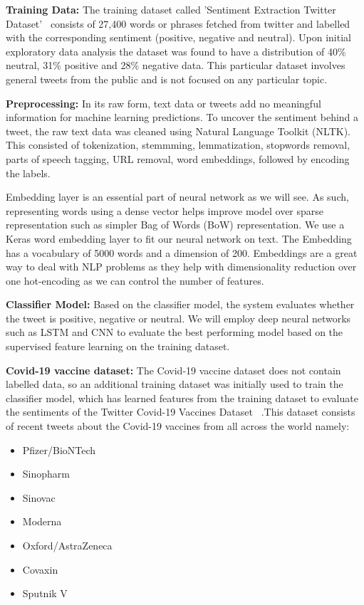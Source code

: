 \documentclass[conference]{IEEEtran}
\begin{document}
\textbf{Training Data:} The training dataset called 'Sentiment Extraction Twitter Dataset'~\cite{bworld} consists of 27,400 words or phrases fetched from twitter and labelled with the corresponding sentiment (positive, negative and neutral). Upon initial exploratory data analysis the dataset was found to have a distribution of 40\% neutral, 31\% positive and 28\% negative data. This particular dataset involves general tweets from the public and is not focused on any particular topic.

\textbf{Preprocessing:} In its raw form, text data or tweets add no meaningful information for machine learning predictions. To uncover the sentiment behind a tweet, the raw text data was cleaned using Natural Language Toolkit (NLTK). This consisted of tokenization, stemmming, lemmatization, stopwords removal, parts of speech tagging, URL removal, word embeddings, followed by encoding the labels.

Embedding layer is an essential part of neural network as we will see.  As such, representing words using a dense vector helps improve model over sparse representation such as simpler Bag of Words (BoW) representation. We use a Keras word embedding layer to fit our neural network on text. The Embedding has a vocabulary of 5000 words and a dimension of 200. Embeddings are a great way to deal with NLP problems as they help with dimensionality reduction over one hot-encoding as we can control the number of features.\

\textbf{Classifier Model:} Based on the classifier model, the system evaluates whether the tweet is positive, negative or neutral. We will employ deep neural networks such as LSTM and CNN to evaluate the best performing model based on the supervised feature learning on the training dataset. 

\textbf{Covid-19 vaccine dataset:} The Covid-19 vaccine dataset does not contain labelled data, so an additional training dataset was initially used to train the classifier model, which has learned features from the training dataset to evaluate the sentiments of the Twitter Covid-19 Vaccines Dataset ~\cite{cworld}.This dataset consists of recent tweets about the Covid-19 vaccines from all across the world namely: 
\begin{itemize}
    \item Pfizer/BioNTech
    \item Sinopharm
    \item Sinovac
    \item Moderna 
    \item Oxford/AstraZeneca
    \item Covaxin 
    \item Sputnik V
\end{itemize}
\end{document}
